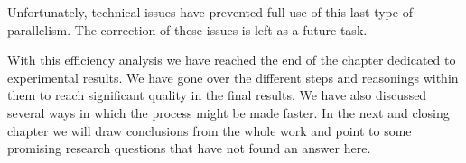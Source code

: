 		Unfortunately, technical issues have prevented full use of this last type of parallelism. The correction of these issues is left as a future task.

		With this efficiency analysis we have reached the end of the chapter dedicated to experimental results. We have gone over the different steps and reasonings within them to reach significant quality in the final results. We have also discussed several ways in which the process might be made faster. In the next and closing chapter we will draw conclusions from the whole work and point to some promising research questions that have not found an answer here.